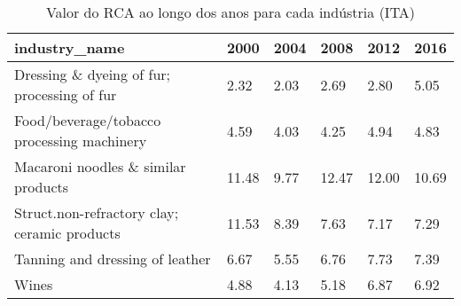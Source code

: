\begin{table}
\centering
\caption{Valor do RCA ao longo dos anos para cada indústria (ITA)}
\begin{tabular}{p{6cm}p{1.5cm}p{1.5cm}p{1.5cm}p{1.5cm}p{1.5cm}}
\toprule
                               industry\_name &  2000 & 2004 &  2008 &  2012 &  2016 \\
\midrule
 Dressing \& dyeing of fur; processing of fur &  2.32 & 2.03 &  2.69 &  2.80 &  5.05 \\
  Food/beverage/tobacco processing machinery &  4.59 & 4.03 &  4.25 &  4.94 &  4.83 \\
         Macaroni noodles \& similar products & 11.48 & 9.77 & 12.47 & 12.00 & 10.69 \\
Struct.non-refractory clay; ceramic products & 11.53 & 8.39 &  7.63 &  7.17 &  7.29 \\
             Tanning and dressing of leather &  6.67 & 5.55 &  6.76 &  7.73 &  7.39 \\
                                       Wines &  4.88 & 4.13 &  5.18 &  6.87 &  6.92 \\
\bottomrule
\end{tabular}
\end{table}
